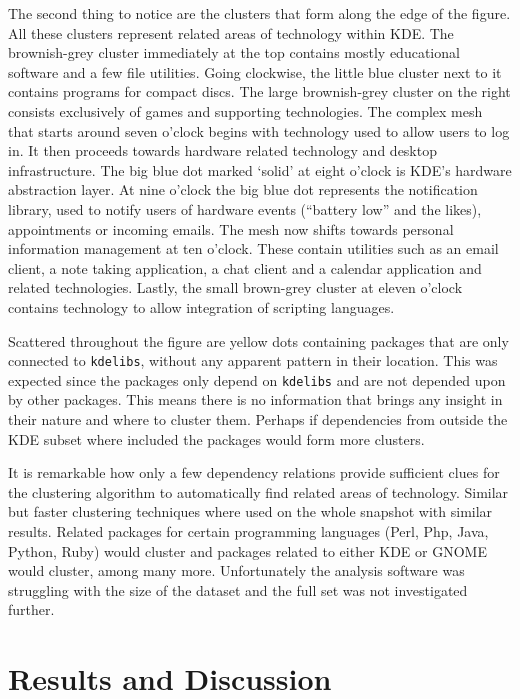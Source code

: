 \documentclass[smallextended,final]{svjour3}
\begin{document}
The second thing to notice are the clusters that form along the edge of the figure. All these clusters represent related areas of technology within KDE. The brownish-grey cluster immediately at the top contains mostly educational software and a few file utilities. Going clockwise, the little blue cluster next to it contains programs for compact discs. The large brownish-grey cluster on the right consists exclusively of games and supporting technologies. The complex mesh that starts around seven o'clock begins with technology used to allow users to log in. It then proceeds towards hardware related technology and desktop infrastructure. The big blue dot marked `solid' at eight o'clock is KDE's hardware abstraction layer. At nine o'clock the big blue dot represents the notification library, used to notify users of hardware events (``battery low'' and the likes), appointments or incoming emails. The mesh now shifts towards personal information management at ten o'clock. These contain utilities such as an email client, a note taking application, a chat client and a calendar application and related technologies. Lastly, the small brown-grey cluster at eleven o'clock contains technology to allow integration of scripting languages.

Scattered throughout the figure are yellow dots containing packages that are only connected to \verb|kdelibs|, without any apparent pattern in their location. This was expected since the packages only depend on \verb|kdelibs| and are not depended upon by other packages. This means there is no information that brings any insight in their nature and where to cluster them. Perhaps if dependencies from outside the KDE subset where included the packages would form more clusters.

It is remarkable how only a few dependency relations provide sufficient clues for the clustering algorithm to automatically find related areas of technology. Similar but faster clustering techniques where used on the whole snapshot with similar results. Related packages for certain programming languages (Perl, Php, Java, Python, Ruby) would cluster and packages related to either KDE or GNOME would cluster, among many more. Unfortunately the analysis software was struggling with the size of the dataset and the full set was not investigated further.

\section{Results and Discussion}
\end{document}
